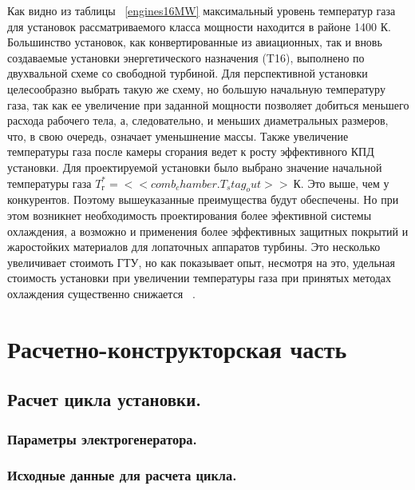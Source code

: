 \documentclass[a4paper,12pt]{article}
\begin{document}
    Как видно из таблицы ~\ref{engines16MW} максимальный уровень температур газа для установок рассматриваемого
    класса мощности находится в районе 1400 К.
    Большинство установок, как конвертированные из авиационных, так и вновь создаваемые установки энергетического
    назначения (T16), выполнено по двухвальной схеме со свободной турбиной.
    Для перспективной установки целесообразно выбрать такую же схему, но большую начальную температуру газа,
    так как ее увеличение при заданной мощности позволяет добиться меньшего расхода рабочего тела, а, следовательно,
    и меньших диаметральных размеров, что, в свою очередь, означает уменьшнение массы.
    Также увеличение температуры газа после камеры сгорания ведет к росту эффективного КПД установки.
    Для проектируемой установки было выбрано значение начальной температуры газа $T_г^* = << comb_chamber.T_stag_out >>\ К$.
    Это выше, чем у конкурентов.
    Поэтому вышеуказанные преимущества будут обеспечены.
    Но при этом возникнет необходимость проектирования более эфективной системы охлаждения, а
    возможно и применения более эффективных защитных покрытий и жаростойких материалов для лопаточных
    аппаратов турбины.
    Это несколько увеличивает стоимоть ГТУ, но как показывает опыт, несмотря на это, удельная стоимость установки
    при увеличении температуры газа при принятых методах охлаждения существенно снижается ~\cite{manushin_eliseev_proektirovanie}.

    \newpage

    \section{Расчетно-конструкторская часть}

    \subsection{Расчет цикла установки.}

    \subsubsection{Параметры электрогенератора.}


    \subsubsection{Исходные данные для расчета цикла.}
\end{document}
